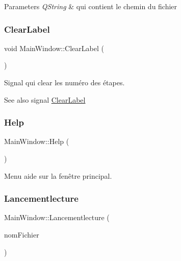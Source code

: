 \begin{DoxyParams}{Parameters}
{\em Q\+String} & qui contient le chemin du fichier \\
\hline
\end{DoxyParams}
\mbox{\label{class_main_window_a9a0c33e6e696ffc763560205f992650d}} 
\subsubsection{\texorpdfstring{Clear\+Label}{ClearLabel}}
{\footnotesize\ttfamily void Main\+Window\+::\+Clear\+Label (\begin{DoxyParamCaption}{ }\end{DoxyParamCaption})\hspace{0.3cm}{\ttfamily [signal]}}



Signal qui clear les numéro des étapes. 

\begin{DoxySeeAlso}{See also}
signal \hyperlink{class_main_window_a9a0c33e6e696ffc763560205f992650d}{Clear\+Label} 
\end{DoxySeeAlso}
\mbox{\label{class_main_window_a25ec89113c14218717cfade9a58f8fdb}} 
\subsubsection{\texorpdfstring{Help}{Help}}
{\footnotesize\ttfamily Main\+Window\+::\+Help (\begin{DoxyParamCaption}{ }\end{DoxyParamCaption})\hspace{0.3cm}{\ttfamily [slot]}}



Menu aide sur la fenêtre principal. 

\mbox{\label{class_main_window_ac368dfd7e2609f0cb72fc1428771aa97}} 
\subsubsection{\texorpdfstring{Lancementlecture}{Lancementlecture}}
{\footnotesize\ttfamily Main\+Window\+::\+Lancementlecture (\begin{DoxyParamCaption}\item[{Q\+String}]{nom\+Fichier }\end{DoxyParamCaption})\hspace{0.3cm}{\ttfamily [slot]}}




